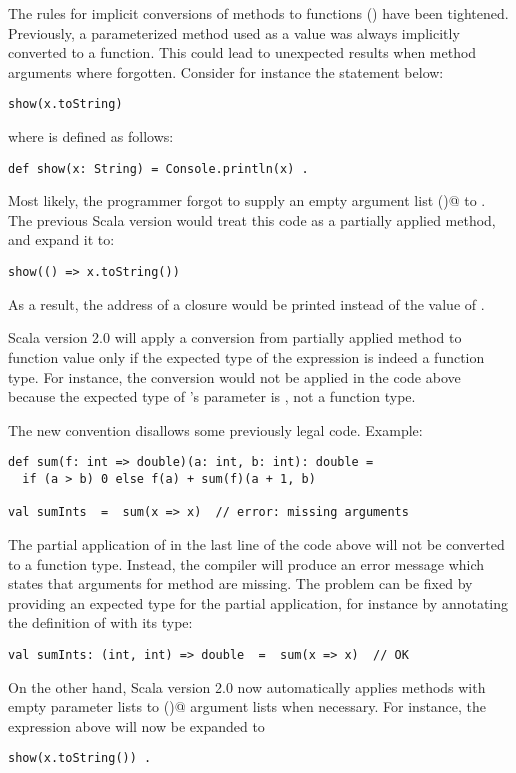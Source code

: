The rules for implicit conversions of methods to functions
() have been tightened. Previously, a
parameterized method used as a value was always implicitly converted
to a function. This could lead to unexpected results when method
arguments where forgotten. Consider for instance the statement below:
\begin{lstlisting}
show(x.toString)
\end{lstlisting}
where \lstinline@show@ is defined as follows:
\begin{lstlisting}
def show(x: String) = Console.println(x) .
\end{lstlisting}
Most likely, the programmer forgot to supply an empty argument list
\lstinline@()@ to \lstinline@toString@. The previous Scala version would
treat this code as a partially applied method, and expand it to:
\begin{lstlisting}
show(() => x.toString())
\end{lstlisting}
As a result, the address of a closure would be printed instead of the
value of \lstinline@s@.

Scala version 2.0 will apply a conversion from partially applied
method to function value only if the expected type of the expression
is indeed a function type. For instance, the conversion would not be
applied in the code above because the expected type of
\lstinline@show@'s parameter is \lstinline@String@, not a function
type. 

The new convention disallows some previously legal code. Example:
\begin{lstlisting}
def sum(f: int => double)(a: int, b: int): double =
  if (a > b) 0 else f(a) + sum(f)(a + 1, b)

val sumInts  =  sum(x => x)  // error: missing arguments
\end{lstlisting}
The partial application of \lstinline@sum@ in the last line of
the code above will not be converted to a function type. Instead, the
compiler will produce an error message which states that arguments for method
\lstinline@sum@ are missing. The problem can be fixed by providing an
expected type for the partial application, for instance by annotating
the definition of \lstinline@sumInts@ with its type:
\begin{lstlisting}
val sumInts: (int, int) => double  =  sum(x => x)  // OK
\end{lstlisting}

On the other hand, Scala version 2.0 now automatically applies methods
with empty parameter lists to \lstinline@()@ argument lists when
necessary. For instance, the \lstinline@show@ expression above will
now be expanded to
\begin{lstlisting}
show(x.toString()) .
\end{lstlisting}

